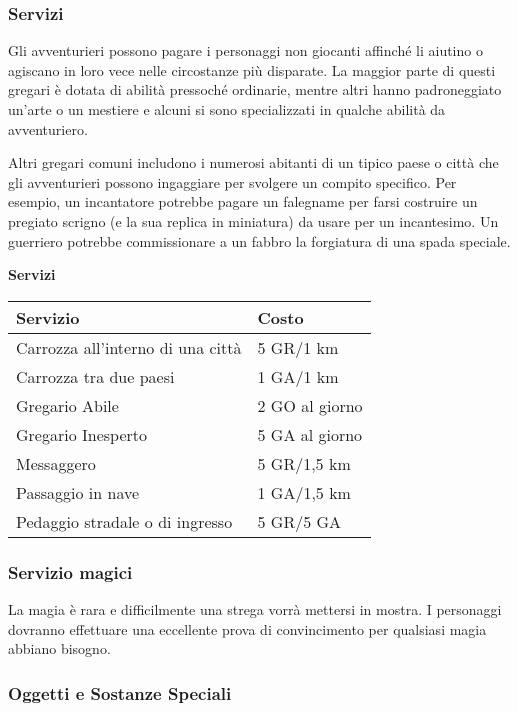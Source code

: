 \documentclass[12pt,a4paper,twoside,openany]{book}
\begin{document}
\begin{multicols}{2}


\subsubsection{Servizi}


Gli avventurieri possono pagare i personaggi non giocanti affinché li aiutino o agiscano in loro vece nelle circostanze più disparate. La maggior parte di questi gregari è dotata di abilità pressoché ordinarie, mentre altri hanno padroneggiato un'arte o un mestiere e alcuni si sono specializzati in qualche abilità da avventuriero.

Altri gregari comuni includono i numerosi abitanti di un tipico paese o città che gli avventurieri possono ingaggiare per svolgere un compito specifico. Per esempio, un incantatore potrebbe pagare un falegname per farsi costruire un pregiato scrigno (e la sua replica in miniatura) da usare per un incantesimo.
Un guerriero potrebbe commissionare a un fabbro la forgiatura di una spada speciale.

\medskip

\textbf{Servizi}

\bigskip

\begin{tabularx}{0.45\textwidth}{Xl}
\textbf{Servizio}&\textbf{Costo}\\
\toprule
Carrozza all'interno di una città&5 GR/1 km\\
Carrozza tra due paesi&1 GA/1 km\\
Gregario Abile&2 GO al giorno\\
Gregario Inesperto&5 GA al giorno\\
Messaggero&5 GR/1,5 km\\
Passaggio in nave&1 GA/1,5 km\\
Pedaggio stradale o di ingresso&5 GR/5 GA\\
\end{tabularx}


\subsubsection{Servizio magici}


La magia è rara e difficilmente una strega vorrà mettersi in mostra.
I personaggi dovranno effettuare una eccellente prova di convincimento per qualsiasi magia abbiano bisogno.

\subsubsection{Oggetti e Sostanze Speciali}


\end{multicols}
\end{document}
